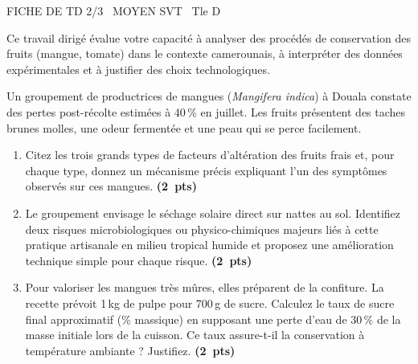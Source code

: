 \documentclass[11pt]{article}
\begin{document}
\begin{tcolorbox}[enhanced,colback=popink,colframe=popink,arc=10pt,boxrule=0pt,left=12pt,right=12pt,top=9pt,bottom=9pt]
{\color{white}\popxbold\small FICHE DE TD 2/3 \textbullet\ MOYEN \hfill SVT \textbullet\ Tle D\par}
\end{tcolorbox}
\vspace{4pt}
\noindent Ce travail dirigé évalue votre capacité à analyser des procédés de conservation des fruits (mangue, tomate) dans le contexte camerounais, à interpréter des données expérimentales et à justifier des choix technologiques.

\begin{exercice}
Un groupement de productrices de mangues (\textit{Mangifera indica}) à Douala constate des pertes post-récolte estimées à 40\,\% en juillet. Les fruits présentent des taches brunes molles, une odeur fermentée et une peau qui se perce facilement.
\begin{enumerate}
    \item Citez les trois grands types de facteurs d'altération des fruits frais et, pour chaque type, donnez un mécanisme précis expliquant l'un des symptômes observés sur ces mangues. \textbf{(2~pts)}
    \item Le groupement envisage le séchage solaire direct sur nattes au sol. Identifiez deux risques microbiologiques ou physico-chimiques majeurs liés à cette pratique artisanale en milieu tropical humide et proposez une amélioration technique simple pour chaque risque. \textbf{(2~pts)}
    \item Pour valoriser les mangues très mûres, elles préparent de la confiture. La recette prévoit 1\,kg de pulpe pour 700\,g de sucre. Calculez le taux de sucre final approximatif (\% massique) en supposant une perte d'eau de 30\,\% de la masse initiale lors de la cuisson. Ce taux assure-t-il la conservation à température ambiante ? Justifiez. \textbf{(2~pts)}
\end{enumerate}
\end{exercice}
\end{document}
